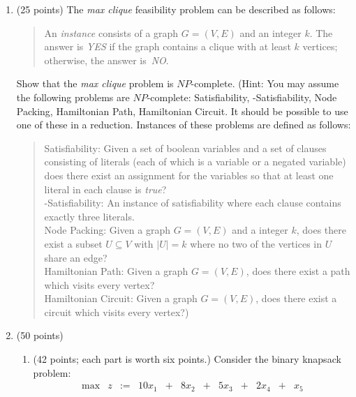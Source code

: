 \begin{enumerate}
  \item (25 points)
     The {\em max clique} feasibility problem can be described
     as follows:
     \begin{quote}
       An {\em instance} consists of a graph $G=(V,E)$ and an integer $k$.
       The answer is {\em YES} if the graph contains a clique with at
       least $k$ vertices; otherwise, the answer is~{\em NO}.
     \end{quote}
     Show that the {\em max clique} problem is $NP$-complete.
     (Hint: You may assume the following problems are $NP$-complete:
     {\sc Satisfiability}, {-Satisfiability},
     {\sc Node Packing}, {\sc Hamiltonian Path}, {\sc Hamiltonian Circuit}.
     It should be possible to use one of these in a reduction.
     Instances of these problems are defined as follows:
     \begin{quote}
       {\sc Satisfiability:} Given a set of boolean variables
        and a set of clauses consisting of
        literals (each of which is a variable or a negated variable)
        does there exist
        an assignment for the variables so that at least one literal
        in each clause is {\em true}?  \\
       {-Satisfiability:}
        An instance of satisfiability where each clause contains exactly
        three literals.  \\
       {\sc Node Packing:}
        Given a graph $G=(V,E)$ and a integer $k$,
        does there exist a subset $U \subseteq V$
        with $\mid \! U \! \mid = k$
        where no two of the vertices in $U$ share an edge?  \\
       {\sc Hamiltonian Path:}
        Given a graph $G=(V,E)$, does there exist a path which visits
        every vertex?  \\
       {\sc Hamiltonian Circuit:}
        Given a graph $G=(V,E)$, does there exist a circuit which visits
        every vertex?)
     \end{quote}
  \item (50 points)
      \begin{enumerate}
         \item (42 points; each part is worth six points.) \label{particular}
            Consider the binary knapsack problem:
            \begin{displaymath}
              \begin{array}{lccrcrcrcrcrcl}
     \max  & z & :=      & 10x_1 & + & 8x_2 & + & 5x_3 & + & 2x_4 & + & x_5 \\

\end{array}
\end{displaymath}
\end{enumerate}
\end{enumerate}
